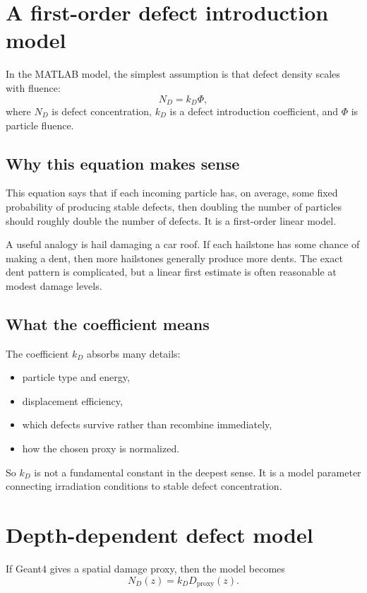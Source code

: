 \documentclass[11pt]{article}
\begin{document}
\section{A first-order defect introduction model}
In the MATLAB model, the simplest assumption is that defect density scales with fluence:
\begin{equation}
N_D = k_D \Phi,
\end{equation}
where $N_D$ is defect concentration, $k_D$ is a defect introduction coefficient, and $\Phi$ is particle fluence.

\subsection{Why this equation makes sense}
This equation says that if each incoming particle has, on average, some fixed probability of producing stable defects, then doubling the number of particles should roughly double the number of defects. It is a first-order linear model.

A useful analogy is hail damaging a car roof. If each hailstone has some chance of making a dent, then more hailstones generally produce more dents. The exact dent pattern is complicated, but a linear first estimate is often reasonable at modest damage levels.

\subsection{What the coefficient means}
The coefficient $k_D$ absorbs many details:
\begin{itemize}
    \item particle type and energy,
    \item displacement efficiency,
    \item which defects survive rather than recombine immediately,
    \item how the chosen proxy is normalized.
\end{itemize}
So $k_D$ is not a fundamental constant in the deepest sense. It is a model parameter connecting irradiation conditions to stable defect concentration.

\section{Depth-dependent defect model}
If Geant4 gives a spatial damage proxy, then the model becomes
\begin{equation}
N_D(z) = k_D D_{\mathrm{proxy}}(z).
\end{equation}
\end{document}
